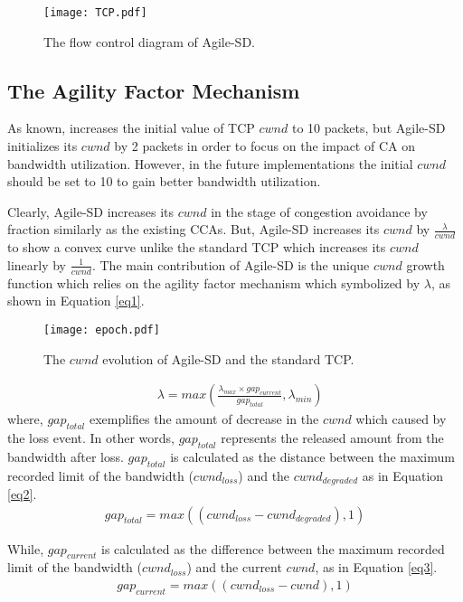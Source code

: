 \documentclass[preprint,3p,times,twocolumn,authoryear]{elsarticle}
\begin{document}
\begin{figure}[h!]
\centering
\texttt{[image: TCP.pdf]}
\caption{The flow control diagram of Agile-SD.}
\label{fig:TCP}
\end{figure}

\subsection{The Agility Factor Mechanism}
As known, \citet{RFC6928} increases the initial value of TCP $cwnd$ to 10 packets, but Agile-SD initializes its $cwnd$ by 2 packets in order to focus on the impact of CA on bandwidth utilization. However, in the future implementations the initial $cwnd$ should be set to 10 to gain better bandwidth utilization.

Clearly, Agile-SD increases its $cwnd$ in the stage of congestion avoidance by fraction similarly as the existing CCAs. But, Agile-SD increases its $cwnd$ by $\frac{\lambda}{cwnd}$ to show a convex curve unlike the standard TCP which increases its $cwnd$ linearly by $\frac{1}{cwnd}$. The main contribution of Agile-SD is the unique $cwnd$ growth function which relies on the agility factor mechanism which symbolized by $\lambda$, as shown in Equation \eqref{eq1}.
\begin{figure}[t]
\centering
\texttt{[image: epoch.pdf]}
\caption{The $cwnd$ evolution of Agile-SD and the standard TCP.}
\label{fig:epoch}
\end{figure}
\begin{align}
&\lambda = max\left( \frac{\lambda_{max} \times gap_{current}}{gap_{total}}, \lambda_{min}\right)	\label{eq1}
\end{align}
where, $gap_{total}$ exemplifies the amount of decrease in the $cwnd$ which caused by the loss event. In other words, $gap_{total}$ represents the released amount from the bandwidth after loss. $gap_{total}$ is calculated as the distance between the maximum recorded limit of the bandwidth ($cwnd_{loss}$) and the $cwnd_{degraded}$ as in Equation \eqref{eq2}.
\begin{align}
gap_{total} = max\left((cwnd_{loss} - cwnd_{degraded}), 1\right)							\label{eq2}
\end{align}

While, $gap_{current}$ is calculated as the difference between the maximum recorded limit of the bandwidth ($cwnd_{loss}$) and the current $cwnd$, as in Equation \eqref{eq3}.
\begin{align}
gap_{current} = max\left((cwnd_{loss} - cwnd), 1\right)										\label{eq3}
\end{align}
\end{document}

